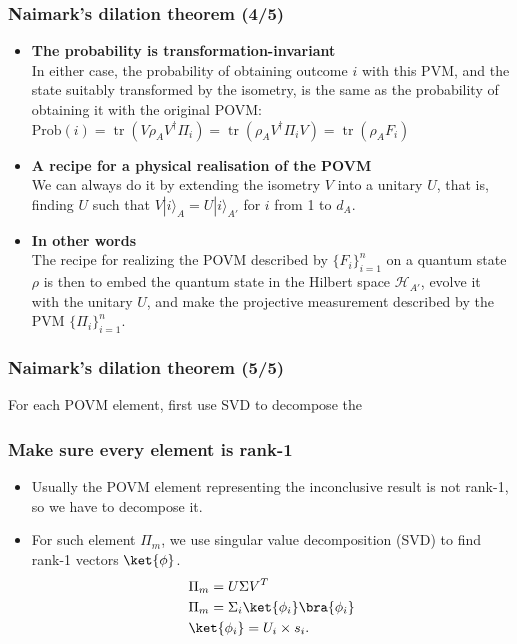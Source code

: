 \documentclass{beamer}
\begin{document}
\begin{frame}
    \frametitle{Naimark's dilation theorem (4/5)}
    \begin{itemize}
        \item \textbf{The probability is transformation-invariant}\\
              In either case, the probability of obtaining outcome
              $i$ with this PVM, and the state suitably transformed by the isometry, is the same as the probability of obtaining it with the original POVM:
              ${\displaystyle {\text{Prob}}(i)=\operatorname {tr} \left(V\rho _{A}V^{\dagger }\Pi _{i}\right)=\operatorname {tr} \left(\rho _{A}V^{\dagger }\Pi _{i}V\right)=\operatorname {tr} (\rho _{A}F_{i})}$
        \item \textbf{A recipe for a physical realisation of the POVM}\\
              We can always do it by extending the isometry
              $V$ into a unitary $U$, that is, finding
              $U$ such that ${\displaystyle V|i\rangle _{A}=U|i\rangle _{A'}}$
              for $i$ from 1 to $d_{A}$.
        \item \textbf{In other words}\\
              The recipe for realizing the POVM described by
              $\{F_{i}\}_{i=1}^{n}$ on a quantum state $\rho$
              is then to embed the quantum state in the Hilbert space
              ${\mathcal {H}}_{A'}$, evolve it with the unitary
              $U$, and make the projective measurement described by the PVM
              ${\displaystyle \{\Pi _{i}\}_{i=1}^{n}}$.
    \end{itemize}
\end{frame}

\begin{frame}
    \frametitle{Naimark's dilation theorem (5/5)}
    \centering
    \tikzexternaldisable
    \scalebox{0.45}{
        
    }
    \tikzexternalenable

    For each POVM element, first use SVD to decompose the
\end{frame}

\begin{frame}
    \frametitle{Make sure every element is rank-1}
    \begin{itemize}
        \item Usually the POVM element representing the inconclusive result
              is not rank-1, so we have to decompose it.
        \item For such element $\Pi_{m}$, we use singular value decomposition
              (SVD) to find rank-1 vectors $\ket{\phi}$.
              \begin{align}
                   & \Pi_{m} = U \Sigma V^{T}                           \\
                   & \Pi_{m} = \Sigma_{i} \ket{\phi_{i}} \bra{\phi_{i}} \\
                   & \ket{\phi_{i}} = U_{i} \times s_{i}.
              \end{align}
    \end{itemize}
\end{frame}
\end{document}
